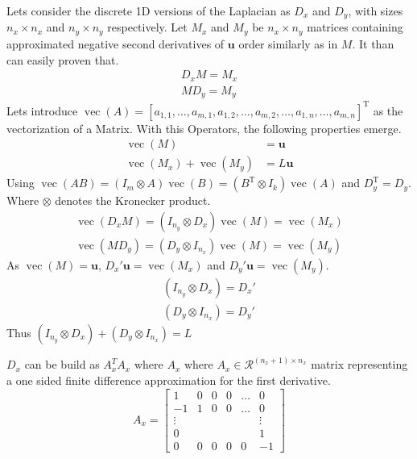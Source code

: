 \documentclass{article}
\begin{document}
Lets consider the discrete 1D versions of the Laplacian as $D_x$ and $D_y$, with sizes $n_x \times n_x$ and $n_y \times n_y$ respectively.
Let $M_x$ and $M_y$ be $n_x\times n_y$ matrices containing approximated negative second derivatives of $\mathbf{u}$ order similarly as in $M$. It than can easily proven that.
\begin{align}
    D_x M = M_x \\
    M D_y = M_y
\end{align}
Lets introduce $\operatorname{vec}(A)=\left[a_{1,1}, \ldots, a_{m, 1}, a_{1,2}, \ldots, a_{m, 2}, \ldots, a_{1, n}, \ldots, a_{m, n}\right]^{\mathrm{T}}$ as the vectorization of a Matrix. With this Operators, the following properties emerge.
\begin{align}
    \operatorname{vec}(M) &= \mathbf{u} \\
    \operatorname{vec}(M_x) + \operatorname{vec}(M_y) &= L\mathbf{u}
\end{align}
Using $\operatorname{vec}(A B)=\left(I_{m} \otimes A\right) \operatorname{vec}(B)=\left(B^{\mathrm{T}} \otimes I_{k}\right) \operatorname{vec}(A)$ and $D_y^{\mathrm{T}} = D_y$. Where $\otimes$ denotes the Kronecker product.
\begin{align}
    \operatorname{vec}(D_x M) = (I_{n_y} \otimes D_x)\operatorname{vec}(M) = \operatorname{vec}(M_x)\\
    \operatorname{vec}(M D_y) = (D_y \otimes I_{n_x})\operatorname{vec}(M) = \operatorname{vec}(M_y)
\end{align} 
As $\operatorname{vec}(M) = \mathbf{u}$, $D_x' \mathbf{u} = \operatorname{vec}(M_x)$ and $D_y' \mathbf{u} = \operatorname{vec}(M_y)$.
\begin{align}
    (I_{n_y} \otimes D_x) = D_x' \\
    (D_y \otimes I_{n_x}) = D_y'
\end{align}
Thus $(I_{n_y} \otimes D_x) + (D_y \otimes I_{n_x}) = L$\par
$D_x$ can be build as $A_x^T A_x$ where $A_x$ where $A_x \in \mathcal{R}^{(n_x+1) \times n_x}$ matrix representing a one sided finite difference approximation for the first derivative.
\begin{equation}
	 A_x = 
     \begin{bmatrix}{1} & {0} & {0} & {0} & {\ldots} & {0} \\ {-1} & {1} & {0} & {0} & {\ldots} & {0} \\ {\vdots} & {} & {} & {} & {} & {\vdots} \\ {0} & {} & {} & {} & {} & {1} \\ {0} & {0} & {0} & {0} & {0} & {-1}\end{bmatrix}
\end{equation}
\end{document}
